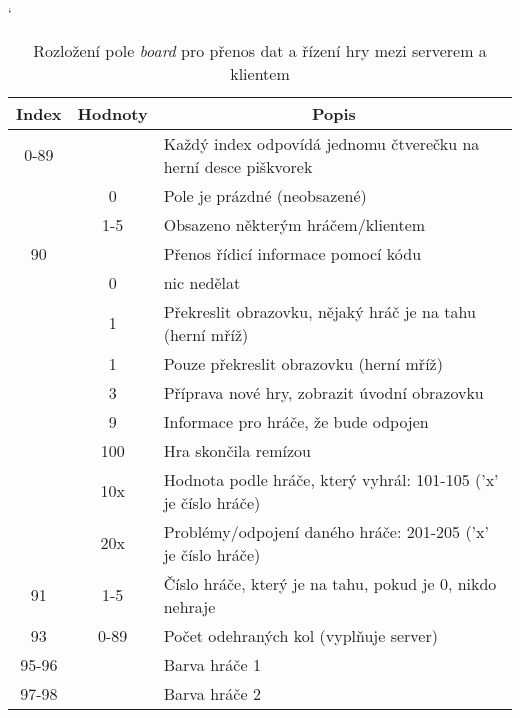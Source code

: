 \begin{table}[hbtp]
\catcode`
\caption{\label{tab:packet_server-client}Rozložení pole \textit{board} pro přenos dat a řízení hry mezi serverem a klientem}
\begin{tabular}{|c|c|l|}
\hline
Index   & Hodnoty     & \multicolumn{1}{c|}{Popis}                                      \\ \hline
0-89    &             & Každý index odpovídá jednomu čtverečku na herní desce piškvorek \\ \cline{2-3}
        & 0           & Pole je prázdné (neobsazené)                                    \\ \cline{2-3}
        & 1-5         & Obsazeno některým hráčem/klientem                               \\ \hline
90      &             & Přenos řídicí informace pomocí kódu                             \\ \cline{2-3}
        & 0           & nic nedělat                                                     \\ \cline{2-3}
        & 1           & Překreslit obrazovku, nějaký hráč je na tahu (herní mříž)       \\ \cline{2-3}
        & 1           & Pouze překreslit obrazovku  (herní mříž)                        \\ \cline{2-3}
        & 3           & Příprava nové hry, zobrazit úvodní obrazovku                    \\ \cline{2-3}
        & 9           & Informace pro hráče, že bude odpojen                            \\ \cline{2-3}
        & 100         & Hra skončila remízou                                            \\ \cline{2-3}
        & 10x         & Hodnota podle hráče, který vyhrál: 101-105 ('x' je číslo hráče) \\ \cline{2-3}
        & 20x         & Problémy/odpojení daného hráče: 201-205 ('x' je číslo hráče)  \\ \hline
91      & 1-5         & Číslo hráče, který je na tahu, pokud je 0, nikdo nehraje        \\ \hline
93      & 0-89        & Počet odehraných kol (vyplňuje server)                          \\ \hline
95-96   &             & Barva hráče 1                                                   \\ \cline{1-1} \cline{3-3}
97-98   &             & Barva hráče 2                                                   \\ \cline{1-1} \cline{3-3}

\end{tabular}
\end{table}
